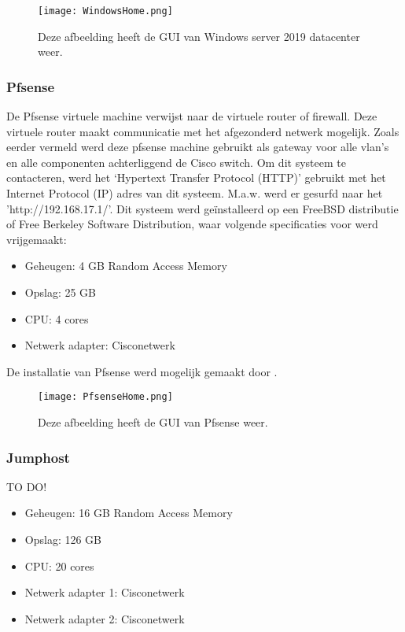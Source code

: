 \begin{figure}[H]
	\centering
	\texttt{[image: WindowsHome.png]}
	\caption{Deze afbeelding heeft de GUI van Windows server 2019 datacenter weer. }
\end{figure}

\subsubsection{Pfsense}
De Pfsense virtuele machine verwijst naar de virtuele router of firewall. Deze virtuele router maakt communicatie met het afgezonderd netwerk mogelijk. Zoals eerder vermeld werd deze pfsense machine gebruikt  als gateway voor alle vlan’s en alle componenten achterliggend de Cisco switch.
\newline
\newline
Om dit systeem te contacteren, werd het ‘Hypertext Transfer Protocol (HTTP)’ gebruikt met het Internet Protocol (IP) adres van dit systeem. M.a.w. werd er gesurfd naar het 'http://192.168.17.1/'.
\newline
\newline
Dit systeem werd geïnstalleerd op een FreeBSD distributie of Free Berkeley Software Distribution, waar volgende specificaties voor werd vrijgemaakt: 

\begin{itemize}
	\item Geheugen: 4 GB Random Access Memory
	\item Opslag: 25 GB
	\item CPU: 4 cores
	\item Netwerk adapter: Cisco\textunderscore netwerk
\end{itemize}
De installatie van Pfsense werd mogelijk gemaakt door \cite{Pfsense_InstallationGuide}.

\begin{figure}[H]
	\centering
	\texttt{[image: PfsenseHome.png]}
	\caption{Deze afbeelding heeft de GUI van Pfsense weer. }
\end{figure}

\subsubsection{Jumphost}
TO DO!

\begin{itemize}
	\item Geheugen: 16 GB Random Access Memory
	\item Opslag: 126 GB
	\item CPU: 20 cores
	\item Netwerk adapter 1: Cisco\textunderscore netwerk
	\item Netwerk adapter 2: Cisco\textunderscore netwerk
\end{itemize}

